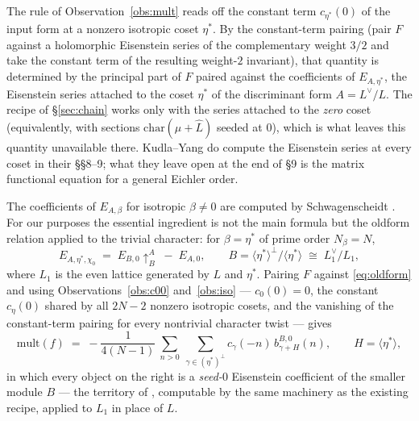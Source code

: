 \documentclass[11pt,reqno]{amsart}
\theoremstyle{plain}
\theoremstyle{definition}
\newcommand{\Ldual}{L^{\vee}}
\begin{document}
The rule of Observation~\ref{obs:mult} reads off the constant term $c_{\eta^*}(0)$ of the input
form at a nonzero isotropic coset $\eta^*$. By the constant-term pairing (pair $F$ against a
holomorphic Eisenstein series of the complementary weight $3/2$ and take the constant term of the
resulting weight-$2$ invariant), that quantity is determined by the principal part of $F$ paired
against the coefficients of $E_{A,\eta^*}$, the Eisenstein series attached to the coset $\eta^*$
of the discriminant form $A=\Ldual/L$. The recipe of \S\ref{sec:chain} works only with the series
attached to the \emph{zero} coset (equivalently, with sections $\mathrm{char}(\mu+\widehat L)$
seeded at $0$), which is what leaves this quantity unavailable there. Kudla--Yang do compute the
Eisenstein series at every coset in their \S\S8--9; what they leave open at the end of \S9 is the
matrix functional equation for a general Eichler order.

The coefficients of $E_{A,\beta}$ for isotropic $\beta\ne0$ are computed by Schwagenscheidt
\cite{Schwag}. For our purposes the essential ingredient is not the main formula but the oldform
relation \cite[Prop.~1.4]{Schwag} applied to the trivial character: for $\beta=\eta^*$ of prime
order $N_\beta=N$,
\begin{equation}\label{eq:oldform}
  E_{A,\eta^*,\chi_0}\;=\;E_{B,0}\!\uparrow_B^A\;-\;E_{A,0},
  \qquad
  B=\langle\eta^*\rangle^{\perp}/\langle\eta^*\rangle\;\cong\;L_1^{\vee}/L_1,
\end{equation}
where $L_1$ is the even lattice generated by $L$ and $\eta^*$. Pairing $F$ against
\eqref{eq:oldform} and using Observations~\ref{obs:c00} and~\ref{obs:iso} --- $c_0(0)=0$, the
constant $c_\eta(0)$ shared by all $2N-2$ nonzero isotropic cosets, and the vanishing of the
constant-term pairing for every nontrivial character twist --- gives
\begin{equation}\label{eq:multformula}
  \mathrm{mult}(f)\;=\;-\frac{1}{4(N-1)}\ \sum_{n>0}\ \sum_{\gamma\in(\eta^*)^{\perp}}
     c_\gamma(-n)\,b^{B,0}_{\gamma+H}(n),
  \qquad H=\langle\eta^*\rangle,
\end{equation}
in which every object on the right is a \emph{seed-$0$} Eisenstein coefficient of the smaller
module $B$ --- the territory of \cite{BK}, computable by the same machinery as the existing
recipe, applied to $L_1$ in place of $L$.
\end{document}
